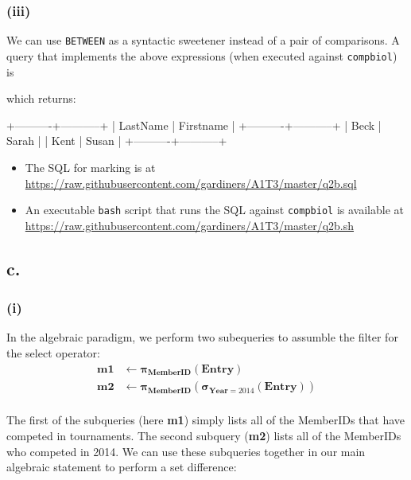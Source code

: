 \documentclass{article}
\newcommand{\select}[1]{
\boldsymbol{\sigma}_{#1}
}
\newcommand{\project}[1]{
\boldsymbol{\pi}_{#1}
}
\begin{document}
\subsubsection{(iii)}

We can use \texttt{BETWEEN} as a syntactic sweetener instead of a pair of comparisons. A query that implements the above expressions (when executed against \texttt{compbiol}) is 


which returns:

\begin{bashinline}
+----------+-----------+
| LastName | Firstname |
+----------+-----------+
| Beck     | Sarah     |
| Kent     | Susan     |
+----------+-----------+
\end{bashinline}

\begin{itemize}
    \item The SQL for marking is at \url{https://raw.githubusercontent.com/gardiners/A1T3/master/q2b.sql}
    \item An executable \texttt{bash} script that runs the SQL against \texttt{compbiol} is available at \url{https://raw.githubusercontent.com/gardiners/A1T3/master/q2b.sh}
\end{itemize}

\subsection{c.}

\subsubsection{(i)}

In the algebraic paradigm, we perform two subequeries to assumble the filter for the select operator:
$$
\begin{aligned}
\mathbf{m1} &\leftarrow \project{\mathbf{MemberID}}(\mathbf{Entry})\\
\mathbf{m2} &\leftarrow \project{\mathbf{MemberID}}\left(\select{\mathbf{Year} = 2014} \left(\mathbf{Entry}\right) \right)\\
\end{aligned}
$$

The first of the subqueries (here \textbf{m1}) simply lists all of the MemberIDs that have competed in tournaments. The second subquery (\textbf{m2}) lists all of the MemberIDs who competed in 2014. We can use these subqueries together in our main algebraic statement to perform a set difference:
\end{document}
